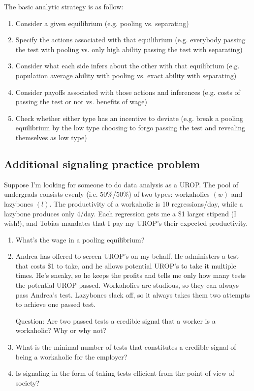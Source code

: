 \documentclass[letter,12pt]{article}
\begin{document}
The basic analytic strategy is as follow:
\begin{enumerate}
	\item Consider a given equilibrium (e.g. pooling vs. separating)
	\item Specify the actions associated with that equilibrium (e.g. everybody passing the test with pooling vs. only high ability passing the test with separating)
	\item Consider what each side infers about the other with that equilibrium (e.g. population average ability with pooling vs. exact ability with separating)
	\item Consider payoffs associated with those actions and inferences (e.g. costs of passing the test or not vs. benefits of wage)
	\item Check whether either type has an incentive to deviate (e.g. break a pooling equilibrium by the low type choosing to forgo passing the test and revealing themselves as low type)
\end{enumerate}


\subsection{Additional signaling practice problem}


Suppose I'm looking for someone to do data analysis as a UROP. The pool of undergrads consists evenly (i.e. 50\%/50\%) of two types: workaholics $(w)$ and lazybones $(l)$. The productivity of a workaholic is 10 regressions/day, while a lazybone produces only 4/day. Each regression gets me a \$1 larger stipend (I wish!), and Tobias mandates that I pay my UROP's their expected productivity.

\begin{enumerate}
	\item What's the wage in a pooling equilibrium?
	\item Andrea has offered to screen UROP's on my behalf. He administers a test that costs \$1 to take, and he allows potential UROP's to take it multiple times. He's sneaky, so he keeps the profits and tells me only how many tests the potential UROP passed. Workaholics are studious, so they can always pass Andrea's test. Lazybones slack off, so it always takes them two attempts to achieve one passed test.

	Question: Are two passed tests a credible signal that a worker is a workaholic? Why or why not?
	\item What is the minimal number of tests that constitutes a credible signal of being a workaholic for the employer?
	\item Is signaling in the form of taking tests efficient from the point of view of society?
\end{enumerate}
\end{document}
